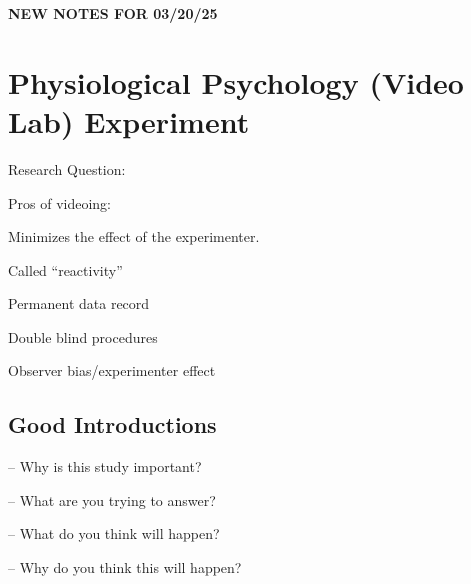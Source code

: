 \newpage

\begin{center}
    \textbf{NEW NOTES FOR 03/20/25} \\
    \hrulefill
\end{center}

\section{Physiological Psychology (Video Lab) Experiment}

Research Question: 

\begin{coloredlist}
    \item Pros of videoing:
    \begin{coloredlist}
        \item Minimizes the effect of the experimenter.
        \begin{coloredlist}
            \item Called ``reactivity''
        \end{coloredlist}
        \item Permanent data record
        \item Double blind procedures
        \begin{coloredlist}
            \item Observer bias/experimenter effect
        \end{coloredlist}
    \end{coloredlist}
\end{coloredlist}

\subsection{Good Introductions}

\begin{coloredlist}
    \item {} -- Why is this study important?
    \begin{coloredlist}
        \item 
    \end{coloredlist}
    \item {} -- What are you trying to answer?
    \item {} -- What do you think will happen?
    \item {} -- Why do you think this will happen?
    \item 
\end{coloredlist}


